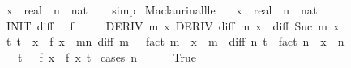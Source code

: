 \begin{isabellebody}
\ \ \ x\ {\isacharcolon}{\kern0pt}{\isacharcolon}{\kern0pt}\ real\ \ n\ {\isacharcolon}{\kern0pt}{\isacharcolon}{\kern0pt}\ nat\isanewline
%
\isadelimproof
\ \ %
\endisadelimproof
%
\isatagproof
{}\isamarkupfalse%
\ simp%
\endisatagproof
{\isafoldproof}%
%
\isadelimproof
\isanewline
%
\endisadelimproof
\isanewline
\isanewline
{}\isamarkupfalse%
\ Maclaurin{\isacharunderscore}{\kern0pt}all{\isacharunderscore}{\kern0pt}le{\isacharcolon}{\kern0pt}\isanewline
\ \ \ x\ {\isacharcolon}{\kern0pt}{\isacharcolon}{\kern0pt}\ real\ \ n\ {\isacharcolon}{\kern0pt}{\isacharcolon}{\kern0pt}\ nat\isanewline
\ \ \ INIT{\isacharcolon}{\kern0pt}\ {\isachardoublequoteopen}diff\ {}\ {\isacharequal}{\kern0pt}\ f{\isachardoublequoteclose}\isanewline
\ \ \ \ \ DERIV{\isacharcolon}{\kern0pt}\ {\isachardoublequoteopen}{\isasymforall}m\ x{\isachardot}{\kern0pt}\ DERIV\ {\isacharparenleft}{\kern0pt}diff\ m{\isacharparenright}{\kern0pt}\ x\ {\isacharcolon}{\kern0pt}{\isachargreater}{\kern0pt}\ diff\ {\isacharparenleft}{\kern0pt}Suc\ m{\isacharparenright}{\kern0pt}\ x{\isachardoublequoteclose}\isanewline
\ \ \ {\isachardoublequoteopen}{\isasymexists}t{\isachardot}{\kern0pt}\ {\isasymbar}t{\isasymbar}\ {\isasymle}\ {\isasymbar}x{\isasymbar}\ {\isasymand}\ f\ x\ {\isacharequal}{\kern0pt}\ {\isacharparenleft}{\kern0pt}{\isasymSum}m{\isacharless}{\kern0pt}n{\isachardot}{\kern0pt}\ {\isacharparenleft}{\kern0pt}diff\ m\ {}\ {\isacharslash}{\kern0pt}\ fact\ m{\isacharparenright}{\kern0pt}\ {\isacharasterisk}{\kern0pt}\ x\ {\isacharcircum}{\kern0pt}\ m{\isacharparenright}{\kern0pt}\ {\isacharplus}{\kern0pt}\ {\isacharparenleft}{\kern0pt}diff\ n\ t\ {\isacharslash}{\kern0pt}\ fact\ n{\isacharparenright}{\kern0pt}\ {\isacharasterisk}{\kern0pt}\ x\ {\isacharcircum}{\kern0pt}\ n{\isachardoublequoteclose}\isanewline
\ \ \ \ {\isacharparenleft}{\kern0pt}\ {\isachardoublequoteopen}{\isasymexists}t{\isachardot}{\kern0pt}\ {\isacharunderscore}{\kern0pt}\ {\isasymand}\ f\ x\ {\isacharequal}{\kern0pt}\ {\isacharquery}{\kern0pt}f\ x\ t{\isachardoublequoteclose}{\isacharparenright}{\kern0pt}\isanewline
%
\isadelimproof
%
\endisadelimproof
%
\isatagproof
{}\isamarkupfalse%
\ {\isacharparenleft}{\kern0pt}cases\ {\isachardoublequoteopen}n\ {\isacharequal}{\kern0pt}\ {}{\isachardoublequoteclose}{\isacharparenright}{\kern0pt}\isanewline
\ \ \isamarkupfalse%
\ True\isanewline
\ \ \isamarkupfalse%

\end{isabellebody}
